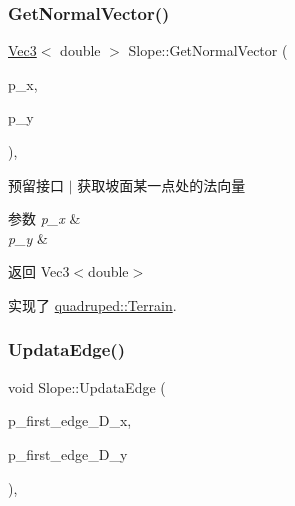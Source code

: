 \mbox{\label{classquadruped_1_1Slope_aaa6bd2fa6b63c5c1b4b3172fd1a5bc0d}} 
\subsubsection{\texorpdfstring{Get\+Normal\+Vector()}{GetNormalVector()}}
{\footnotesize\ttfamily \hyperlink{cppTypes_8h_a65c27bf97693676535dd0b30ea0ad399}{Vec3}$<$ double $>$ Slope\+::\+Get\+Normal\+Vector (\begin{DoxyParamCaption}\item[{double}]{p\+\_\+x,  }\item[{double}]{p\+\_\+y }\end{DoxyParamCaption})\hspace{0.3cm}{\ttfamily [override]}, {\ttfamily [virtual]}}



预留接口 $\vert$ 获取坡面某一点处的法向量 


\begin{DoxyParams}{参数}
{\em p\+\_\+x} & \\
\hline
{\em p\+\_\+y} & \\
\hline
\end{DoxyParams}
\begin{DoxyReturn}{返回}
Vec3$<$double$>$ 
\end{DoxyReturn}


实现了 \hyperlink{classquadruped_1_1Terrain}{quadruped\+::\+Terrain}.

\mbox{\label{classquadruped_1_1Slope_a696cc67c45bff48601eeaa56a54d87f7}} 
\subsubsection{\texorpdfstring{Updata\+Edge()}{UpdataEdge()}}
{\footnotesize\ttfamily void Slope\+::\+Updata\+Edge (\begin{DoxyParamCaption}\item[{double}]{p\+\_\+first\+\_\+edge\+\_\+\+D\+\_\+x,  }\item[{double}]{p\+\_\+first\+\_\+edge\+\_\+\+D\+\_\+y }\end{DoxyParamCaption})\hspace{0.3cm}{\ttfamily [override]}, {\ttfamily [virtual]}}



